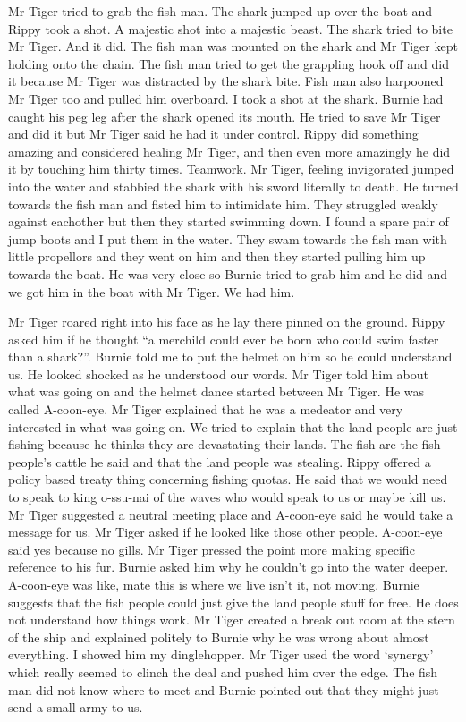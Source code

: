 Mr Tiger tried to grab the fish man. The shark jumped up over the boat and Rippy took a shot. A majestic shot into a majestic beast. The shark tried to bite Mr Tiger. And it did. The fish man was mounted on the shark and Mr Tiger kept holding onto the chain. The fish man tried to get the grappling hook off and did it because Mr Tiger was distracted by the shark bite. Fish man also harpooned Mr Tiger too and pulled him overboard. I took a shot at the shark. Burnie had caught his peg leg after the shark opened its mouth. He tried to save Mr Tiger and did it but Mr Tiger said he had it under control. Rippy did something amazing and considered healing Mr Tiger, and then even more amazingly he did it by touching him thirty times. Teamwork. Mr Tiger, feeling invigorated jumped into the water and stabbied the shark with his sword literally to death. He turned towards the fish man and fisted him to intimidate him. They struggled weakly against eachother but then they started swimming down. I found a spare pair of jump boots and I put them in the water. They swam towards the fish man with little propellors and they went on him and then they started pulling him up towards the boat. He was very close so Burnie tried to grab him and he did and we got him in the boat with Mr Tiger. We had him.\medskip

Mr Tiger roared right into his face as he lay there pinned on the ground. Rippy asked him if he thought “a merchild could ever be born who could swim faster than a shark?”. Burnie told me to put the helmet on him so he could understand us. He looked shocked as he understood our words. Mr Tiger told him about what was going on and the helmet dance started between Mr Tiger. He was called A-coon-eye. Mr Tiger explained that he was a medeator and very interested in what was going on. We tried to explain that the land people are just fishing because he thinks they are devastating their lands. The fish are the fish people’s cattle he said and that the land people was stealing. Rippy offered a policy based treaty thing concerning fishing quotas. He said that we would need to speak to king o-ssu-nai of the waves who would speak to us or maybe kill us. Mr Tiger suggested a neutral meeting place and A-coon-eye said he would take a message for us. Mr Tiger asked if he looked like those other people. A-coon-eye said yes because no gills. Mr Tiger pressed the point more making specific reference to his fur. Burnie asked him why he couldn’t go into the water deeper. A-coon-eye was like, mate this is where we live isn’t it, not moving. Burnie suggests that the fish people could just give the land people stuff for free. He does not understand how things work. Mr Tiger created a break out room at the stern of the ship and explained politely to Burnie why he was wrong about almost everything. I showed him my dinglehopper. Mr Tiger used the word ‘synergy’ which really seemed to clinch the deal and pushed him over the edge. The fish man did not know where to meet and Burnie pointed out that they might just send a small army to us.\medskip


